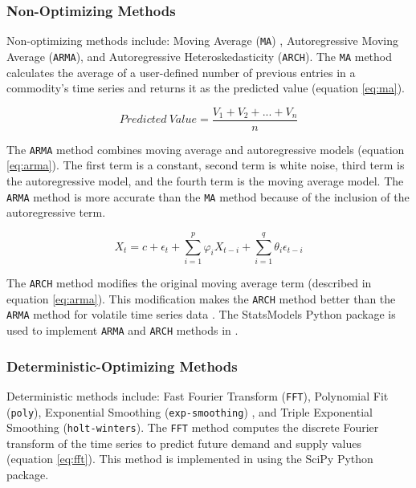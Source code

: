 \subsubsection{Non-Optimizing Methods}
Non-optimizing methods include: Moving Average (\texttt{MA})
, Autoregressive Moving Average (\texttt{ARMA}), and 
Autoregressive Heteroskedasticity (\texttt{ARCH}). 
The \texttt{MA} method calculates the average of 
a user-defined number of previous entries in a commodity's 
time series and returns it as the predicted value 
(equation \ref{eq:ma}).

\begin{equation}
	\label{eq:ma}
	Predicted\ Value = \frac{V_1+V_2+...+V_n}{n}
\end{equation}

The \texttt{ARMA} method combines moving average and
autoregressive models (equation \ref{eq:arma}).
The first term is a constant, second term is 
white noise, third term is the autoregressive
model, and the fourth term is the moving average
model.
The \texttt{ARMA} method is more accurate than the 
\texttt{MA} method 
because of the inclusion of the autoregressive term. 

\begin{equation}
	\label{eq:arma}
	X_t = c + \epsilon_t + 
	\sum_{i=1}^p\varphi_i X_{t-i} +	
	\sum_{i=1}^q\theta_i\epsilon_{t-i}
\end{equation}

The \texttt{ARCH} method modifies the original moving 
average term (described in equation \ref{eq:arma}). 
This modification makes the \texttt{ARCH} method 
better than the \texttt{ARMA} method for volatile time 
series data \cite{flanagan_methods_2019}. 
The StatsModels \cite{github_community_statsmodels:_2019}
Python package is used to implement \texttt{ARMA} and 
\texttt{ARCH} methods in \deploy. 

\subsubsection{Deterministic-Optimizing Methods}
Deterministic methods include: 
Fast Fourier Transform (\texttt{FFT}), 
Polynomial Fit (\texttt{poly}), 
Exponential Smoothing (\texttt{exp-smoothing})
, and Triple Exponential Smoothing (\texttt{holt-winters}). 
The \texttt{FFT} method computes the discrete Fourier transform 
of the time series to predict future demand and supply 
values (equation \ref{eq:fft}).
This method is implemented in \deploy using the 
SciPy \cite{jones_scipy:_2016} Python package. 

